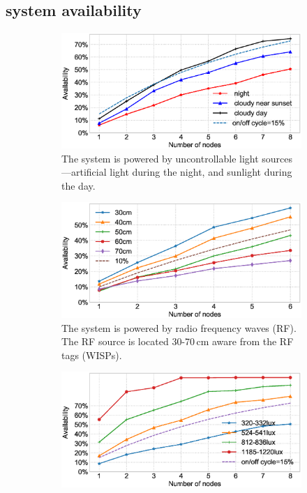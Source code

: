 \subsection{system availability}
\begin{figure}[t]
        \begin{subfigure}{.66\columnwidth}
            \includegraphics[width=\textwidth]{figures/sysAvailability}
                \caption{The system is powered by uncontrollable light sources---artificial light during the night, and sunlight during the day.}
            \label{fig:solarPwrCIS}
        \end{subfigure}\hfill
        \begin{subfigure}{.66\columnwidth}
            \includegraphics[width=\textwidth]{figures/wisp_sysAvailability}
                \caption{The system is powered by radio frequency waves (RF). The RF source is located 30-70\,cm aware from the RF tags (WISPs).}
            \label{fig:rfPwrCIS}
        \end{subfigure}\hfill
        \begin{subfigure}{.66\columnwidth}
            \includegraphics[width=\textwidth]{figures/sysAvailability_artificial-light}

\end{subfigure}
\end{figure}
